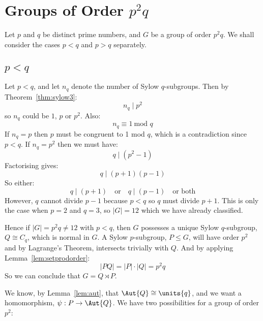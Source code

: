 \section{Groups of Order \(p^2q\)}
Let \(p\) and \(q\) be distinct prime numbers, and \(G\) be a group of order \(p^2q\).
We shall consider the cases \(p < q\) and \(p > q\) separately.



\subsection{\(p < q\)}
Let \(p < q\), and let \(n_q\) denote the number of Sylow \(q\)-subgroups.
Then by Theorem~\ref{thm:sylow3}:
\[n_q \mid p^2\]
so \(n_q\) could be \(1\), \(p\) or \(p^2\).
Also:
\[n_q \equiv 1 \ \text{mod \(q\)}\]
If \(n_q  = p\) then \(p\) must be congruent to 1 mod \(q\), which is a contradiction since \(p < q\).
If \(n_q = p^2\) then we must have:
\[q \mid (p^2 - 1)\]
Factorising gives:
\[q \mid (p+1)(p-1)\]
So either:
\[q \mid (p+1) \quad \text{or} \quad q \mid (p-1) \quad \text{or both}\]
However, \(q\) cannot divide \(p-1\) because \(p < q\) so \(q\) must divide \(p+1\).
This is only the case when \(p = 2\) and \(q = 3\), so \(|G| = 12\) which we have already classified.

Hence if \(|G| = p^2 q \neq 12\) with \(p < q\), then \(G\) possesses a unique Sylow \(q\)-subgroup, \(Q \cong C_q\), which is
normal in \(G\).
A Sylow \(p\)-subgroup, \(P \leqslant G\), will have order \(p^2\) and by Lagrange's Theorem, intersects trivially with
\(Q\).
And by applying Lemma~\ref{lem:setprodorder}:
\[|PQ| = |P| \cdot |Q| = p^2 q\]
So we can conclude that \(G  = Q \rtimes P\).

We know, by Lemma~\ref{lem:aut}, that \(\Aut{Q} \cong \units{q}\), and we want a homomorphism, \(\psi:P \to \Aut{Q}\).
We have two possibilities for a group of order \(p^2\):

